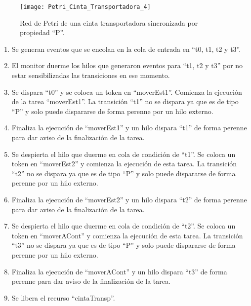 \begin{figure}[H]
    \centering
    \texttt{[image: Petri\_Cinta\_Transportadora\_4]}
    \caption{Red de Petri de una cinta transportadora sincronizada por
    propiedad ``P''.}
    \label{fig:petri_cinta_transportadora_4}
\end{figure}

\begin{enumerate}
    \item Se generan eventos que se encolan en la cola de entrada en “t0, t1,
    t2 y t3”.
	\item El monitor duerme los hilos que generaron eventos para “t1, t2 y t3” por
	no estar sensibilizadas las transiciones en ese momento.
	\item Se dispara ``t0'' y se coloca un token en ``moverEst1''. Comienza la
	ejecución de la tarea ``moverEst1''. La transición ``t1'' no se dispara ya que
	es de tipo ``P'' y solo puede dispararse de forma perenne por un hilo externo.
	\item Finaliza la ejecución de ``moverEst1'' y un hilo dispara ``t1'' de forma
	perenne para dar aviso de la finalización de la tarea.
	\item Se despierta el hilo que
	duerme en cola de condición de ``t1''. Se coloca un token en ``moverEst2'' y
	comienza la ejecución de esta tarea. La transición ``t2'' no se dispara ya que
	es de tipo ``P'' y solo puede dispararse de forma perenne por un hilo externo.
	\item Finaliza la ejecución de ``moverEst2'' y un hilo dispara ``t2'' de forma
	perenne para dar aviso de la finalización de la tarea.
	\item  Se despierta el hilo que
	duerme en cola de condición de ``t2''. Se coloca un token en ``moverACont'' y
	comienza la ejecución de esta tarea. La transición ``t3'' no se dispara ya que
	es de tipo ``P'' y solo puede dispararse de forma perenne por un hilo externo.
	\item Finaliza la ejecución de ``moverACont'' y un hilo dispara ``t3'' de forma
	perenne para dar aviso de la finalización de la tarea.
	\item Se libera el recurso ``cintaTransp''.
\end{enumerate}

